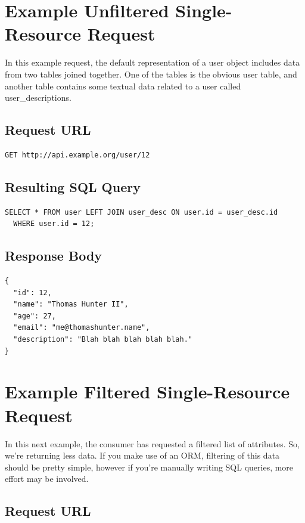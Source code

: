 \documentclass{book}
\begin{document}
\section{Example Unfiltered Single-Resource Request}

In this example request, the default representation of a user object includes data from two tables joined together. One of the tables is the obvious user table, and another table contains some textual data related to a user called user\_descriptions.

\subsection{Request URL}

\begin{verbatim}
GET http://api.example.org/user/12
\end{verbatim}

\subsection{Resulting SQL Query}

\begin{verbatim}
SELECT * FROM user LEFT JOIN user_desc ON user.id = user_desc.id
  WHERE user.id = 12;
\end{verbatim}

\subsection{Response Body}

\begin{verbatim}
{
  "id": 12,
  "name": "Thomas Hunter II",
  "age": 27,
  "email": "me@thomashunter.name",
  "description": "Blah blah blah blah blah."
}
\end{verbatim}

\section{Example Filtered Single-Resource Request}

In this next example, the consumer has requested a filtered list of attributes. So, we're returning less data. If you make use of an ORM, filtering of this data should be pretty simple, however if you're manually writing SQL queries, more effort may be involved.

\subsection{Request URL}
\end{document}
